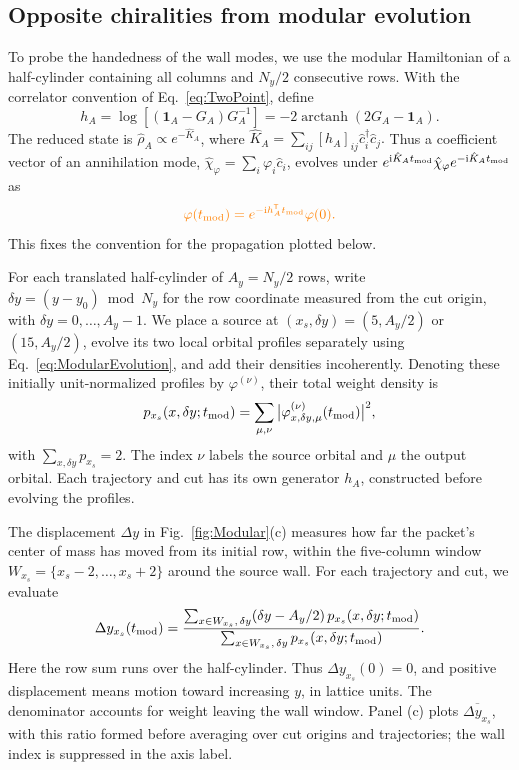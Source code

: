 \documentclass[aps,prb,10pt,twocolumn,superscriptaddress,longbibliography,floatfix]{revtex4-2}
\DeclareMathOperator\arctanh{arctanh}
\newcommand{\ii}{\mathrm{i}}
\newcommand{\Id}{\mathbf{1}}
\newcommand{\claudeadd}[1]{{\color{orange}#1}}
\begin{document}
{\color{blue}
\subsection{Opposite chiralities from modular evolution}
\label{sec:ModularEvolution}

To probe the handedness of the wall modes, we use the modular Hamiltonian of a half-cylinder containing all columns and $N_y/2$ consecutive rows. With the correlator convention of Eq.~\eqref{eq:TwoPoint}, define
\begin{equation}
 h_A=\log[(\Id_A-G_A)G_A^{-1}]=-2\arctanh(2G_A-\Id_A).
 \label{eq:ModularHamiltonian}
\end{equation}
The reduced state is $\hat\rho_A\propto e^{-\hat K_A}$, where \claudeadd{$\hat K_A=\sum_{ij}[h_A]_{ij}\hat c_i^\dagger\hat c_j$.} Thus a coefficient vector of an annihilation mode, $\hat\chi_\varphi=\sum_i\varphi_i\hat c_i$, evolves under $e^{\ii\hat K_A t_{\rm mod}}\hat\chi_\varphi e^{-\ii\hat K_A t_{\rm mod}}$ as
\begin{equation}
 \claudeadd{\varphi(t_{\rm mod})=e^{-\ii h_A^{\mathsf T} t_{\rm mod}}\varphi(0).}
 \label{eq:ModularEvolution}
\end{equation}
This fixes the convention for the propagation plotted below.

For each translated half-cylinder of $A_y=N_y/2$ rows, write $\delta y=(y-y_0)\bmod N_y$ for the row coordinate measured from the cut origin, with $\delta y=0,\ldots,A_y-1$. We place a source at $(x_s,\delta y)=(5,A_y/2)$ or $(15,A_y/2)$, evolve its two local orbital profiles separately using Eq.~\eqref{eq:ModularEvolution}, and add their densities incoherently. Denoting these initially unit-normalized profiles by $\varphi^{(\nu)}$, their total weight density is
\begin{equation}
 p_{x_s}(x,\delta y;t_{\rm mod})=
 \sum_{\mu,\nu}\big|\varphi^{(\nu)}_{x,\delta y,\mu}(t_{\rm mod})\big|^2,
 \label{eq:ModularPacketDensity}
\end{equation}
with $\sum_{x,\delta y}p_{x_s}=2$. The index $\nu$ labels the source orbital and $\mu$ the output orbital. Each trajectory and cut has its own generator $h_A$, constructed before evolving the profiles.

The displacement $\Delta y$ in Fig.~\ref{fig:Modular}(c) measures how far the packet's center of mass has moved from its initial row, within the five-column window $W_{x_s}=\{x_s-2,\ldots,x_s+2\}$ around the source wall. For each trajectory and cut, we evaluate
\begin{equation}
 \Delta y_{x_s}(t_{\rm mod})=
 \frac{\sum_{x\in W_{x_s},\,\delta y}(\delta y-A_y/2)\,p_{x_s}(x,\delta y;t_{\rm mod})}
 {\sum_{x\in W_{x_s},\,\delta y}p_{x_s}(x,\delta y;t_{\rm mod})}.
 \label{eq:ModularDisplacement}
\end{equation}
Here the row sum runs over the half-cylinder. Thus $\Delta y_{x_s}(0)=0$, and positive displacement means motion toward increasing $y$, in lattice units. The denominator accounts for weight leaving the wall window. Panel (c) plots $\overline{\Delta y_{x_s}}$, with this ratio formed before averaging over cut origins and trajectories; the wall index is suppressed in the axis label.

}
\end{document}
